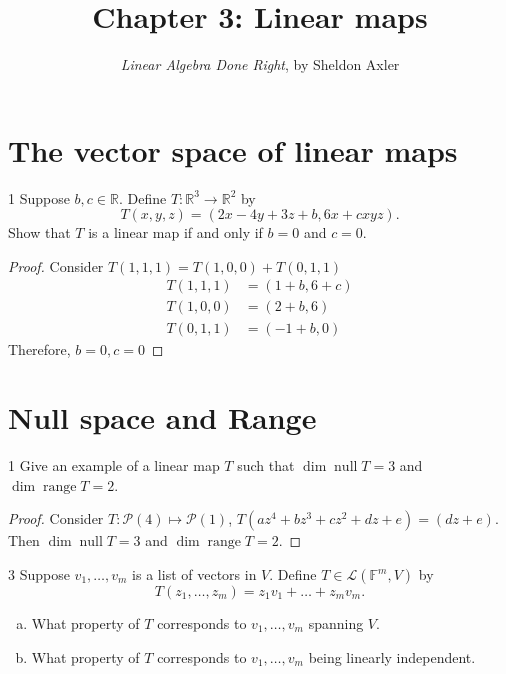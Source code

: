 \documentclass{article}
\title{\vspace{-2em}Chapter 3: Linear maps}
\author{\emph{Linear Algebra Done Right}, by Sheldon Axler}
\date{}
\newenvironment{problem}[1]{\begin{prob*}{#1}{}}{\end{prob*}}
\newcommand{\R}{\mathbb{R}}
\newcommand{\F}{\mathbb{F}}
\newcommand{\poly}{\mathcal{P}}
\newcommand{\Hom}{\mathcal{L}}
\DeclareMathOperator{\Null}{null}
\DeclareMathOperator{\Range}{range}
\begin{document}
\maketitle

\newpage
\tableofcontents
\newpage

\section{The vector space of linear maps}

\begin{problem}{1}
Suppose \(b,c \in \R\). Define \(T : \R^3 \to \R^2\) by \[
	T(x,y,z) = ( 2x - 4y + 3z + b, 6x + cxyz).\]
Show that $T$ is a linear map if and only if \(b = 0\) and \(c = 0\).
\end{problem}


\begin{proof}
	Consider \(T(1,1,1) = T(1,0,0) + T(0,1,1)\)
	\begin{align}
		T(1,1,1) & = (1 + b, 6 + c) \\
		T(1,0,0) & = (2 + b, 6)     \\
		T(0,1,1) & = (-1 + b, 0)
	\end{align}
	Therefore, \(b=0, c=0\)
\end{proof}

\section{Null space and Range}

\begin{problem}{1}
Give an example of a linear map $T$ such that \(\dim \Null T = 3\) and \(\dim \Range T = 2\).
\end{problem}

\begin{proof}
	Consider \(T : \poly (4) \mapsto \poly (1)\), \(T(a z^4 +b z^3 + c z^2 + d z + e) = (d z + e)\). Then \(\dim \Null T = 3\) and \(\dim \Range T = 2\).
\end{proof}

\begin{problem}{3}
Suppose \(v_1 , \dots, v_m\) is a list of vectors in $V$. Define \(T \in \Hom(\F^m, V)\) by \[
	T(z_1, \dots, z_m) = z_1v_1 + \dots + z_mv_m.\]
\begin{enumerate}[(a)]
	\item What property of $T$ corresponds to \(v_1, \dots, v_m\) spanning $V$.
	\item What property of $T$ corresponds to \(v_1, \dots, v_m\) being linearly independent.
\end{enumerate}
\end{problem}
\end{document}
